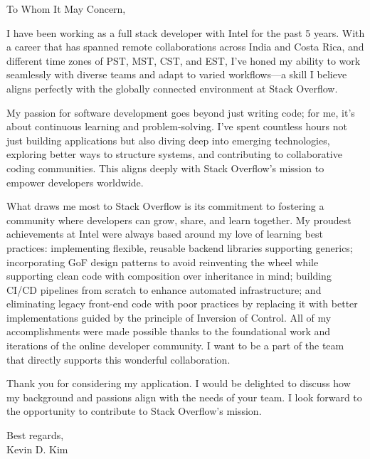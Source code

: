 \documentclass[12pt]{letter}
\date{}
\begin{document}
\begin{letter}{}
To Whom It May Concern,

I have been working as a full stack developer with Intel for the past 5 years. With a career that has spanned remote collaborations across India and Costa Rica, and different time zones of PST, MST, CST, and EST, I’ve honed my ability to work seamlessly with diverse teams and adapt to varied workflows—a skill I believe aligns perfectly with the globally connected environment at Stack Overflow.

My passion for software development goes beyond just writing code; for me, it’s about continuous learning and problem-solving. I’ve spent countless hours not just building applications but also diving deep into emerging technologies, exploring better ways to structure systems, and contributing to collaborative coding communities. This aligns deeply with Stack Overflow’s mission to empower developers worldwide.

What draws me most to Stack Overflow is its commitment to fostering a community where developers can grow, share, and learn together. My proudest achievements at Intel were always based around my love of learning best practices: implementing flexible, reusable backend libraries supporting generics; incorporating GoF design patterns to avoid reinventing the wheel while supporting clean code with composition over inheritance in mind; building CI/CD pipelines from scratch to enhance automated infrastructure; and eliminating legacy front-end code with poor practices by replacing it with better implementations guided by the principle of Inversion of Control. All of my accomplishments were made possible thanks to the foundational work and iterations of the online developer community. I want to be a part of the team that directly supports this wonderful collaboration.

Thank you for considering my application. I would be delighted to discuss how my background and passions align with the needs of your team. I look forward to the opportunity to contribute to Stack Overflow’s mission.

\closing{Best regards,\\[1em] Kevin D. Kim}

\end{letter}
\end{document}
